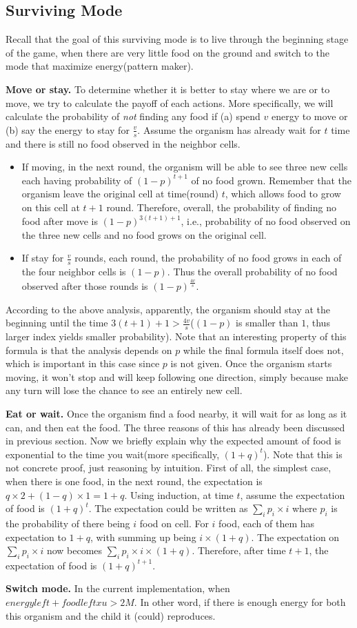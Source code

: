 \subsection{Surviving Mode}
Recall that the goal of this surviving mode is to live through 
the beginning stage of the game, when there are very little food on the ground
and switch to the mode that maximize energy(pattern maker).

\textbf{Move or stay.} To determine whether it is better to stay where we are or 
to move, we try to calculate the payoff of each actions. 
More specifically, we will calculate the probability of \textit{not} finding 
any food if (a) spend $v$ energy to move or (b) say the energy to stay for $\frac{v}{s}$.
Assume the organism has already wait for $t$ time and there is still 
no food observed in the neighbor cells. 
\begin{itemize}
\item If moving, in the next round, the organism will be able to see three new cells each having probability of $(1-p)^{t+1}$ of no food grown.
Remember that the organism leave the original cell at time(round) $t$, 
which allows food to grow on this cell at $t+1$ round.
Therefore, overall, the probability of finding no food after move is $(1-p)^{3(t+1)+1}$,
i.e., probability of no food observed on the three new cells and no food grows on the original cell.

\item If stay for $\frac{v}{s}$ rounds, each round, the probability of no food grows in each of the
four neighbor cells is $(1-p)$. 
Thus the overall probability of no food observed after those rounds is $(1-p)^{\frac{4v}{s}}$.
\end{itemize}
According to the above analysis, apparently, the organism should stay at the beginning 
until the time $3(t+1)+1 > \frac{4v}{s}$($(1-p)$ is smaller than $1$, thus larger index yields 
smaller probability). 
Note that an interesting property of this formula is that the analysis depends on $p$ 
while the final formula itself does not, which is important in this case since $p$ is not given.
Once the organism starts moving, it won't stop and will keep following one direction, simply 
because make any turn will lose the chance to see an entirely new cell.

\textbf{Eat or wait.} Once the organism find a food nearby, it will wait for as long as it can, 
and then eat the food. The three reasons of this has already been discussed in previous section.
Now we briefly explain why the expected amount of food is exponential to the time you wait(more specifically, $(1+q)^t$).
Note that this is not concrete proof, just reasoning by intuition.
First of all, the simplest case, when there is one food, in the next round, the expectation is $q \times 2 + (1-q) \times 1 = 1 + q$.
Using induction, at time $t$, assume the expectation of food is $(1+q)^t$. 
The expectation could be written as $\sum_i p_i \times i$ where $p_i$ is the probability of there being $i$ food on cell. For $i$ food, each of them has expectation to $1+q$, with summing up being $i \times (1+q)$. The expectation on $\sum_i p_i \times i$ now becomes $\sum_i p_i \times i \times (1+q)$. Therefore, after time $t+1$, the expectation of food is $(1+q)^{t+1}$.


\textbf{Switch mode.} In the current implementation, when $energyleft + foodleft x u > 2M$.
In other word, if there is enough energy for both this organism and the child it (could) reproduces.

